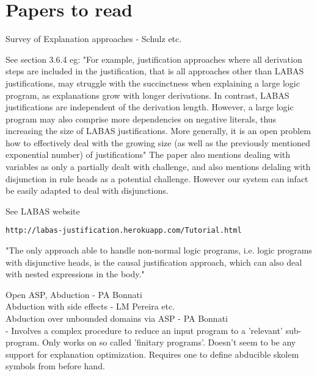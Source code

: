 \documentclass[sigconf]{acmart}
\begin{document}
\section{Papers to read}
Survey of Explanation approaches - Schulz etc.

See section 3.6.4 eg: "For example, justification approaches where all derivation steps are included in the
justification, that is all approaches other than LABAS justifications, may struggle
with the succinctness when explaining a large logic program, as explanations grow
with longer derivations. In contrast, LABAS justifications are independent of the
derivation length. However, a large logic program may also comprise more dependencies on negative literals, thus increasing the size of LABAS justifications. More
generally, it is an open problem how to effectively deal with the growing size (as
well as the previously mentioned exponential number) of justifications" The paper also mentions dealing with variables as only a partially dealt with challenge, and also mentions delaling with disjunction in rule heads as a potential challenge. However our system can infact be easily adapted to deal with disjunctions. 

See LABAS website
\begin{verbatim}
http://labas-justification.herokuapp.com/Tutorial.html    
\end{verbatim}
"The only approach able to handle non-normal
logic programs, i.e. logic programs with disjunctive heads, is the causal justification
approach, which can also deal with nested expressions in the body."

Open ASP, Abduction - PA Bonnati\\
Abduction with side effects - LM Pereira etc.\\
Abduction over unbounded domains via ASP - PA Bonnati\\ - Involves a complex procedure to reduce an input program to a 'relevant' sub-program. Only works on so called 'finitary programs'. Doesn't seem to be any support for explanation optimization. Requires one to define abducible skolem symbols from before hand.
\end{document}
